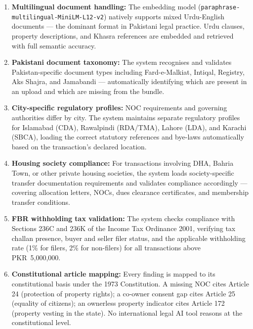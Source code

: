 \documentclass[12pt, a4paper]{article}
\begin{document}
\begin{enumerate}[leftmargin=1.5cm]
    \item \textbf{Multilingual document handling:} The embedding model
    (\texttt{paraphrase-
    multilingual-MiniLM-L12-v2}) natively supports mixed
    Urdu-English documents --- the dominant format in Pakistani legal practice.
    Urdu clauses, property descriptions, and Khasra references are embedded
    and retrieved with full semantic accuracy.

    \item \textbf{Pakistani document taxonomy:} The system recognises and
    validates Pakistan-specific document types including Fard-e-Malkiat,
    Intiqal, Registry, Aks Shajra, and Jamabandi --- automatically identifying
    which are present in an upload and which are missing from the bundle.

    \item \textbf{City-specific regulatory profiles:} NOC requirements and
    governing authorities differ by city. The system maintains separate
    regulatory profiles for Islamabad (CDA), Rawalpindi (RDA/TMA), Lahore
    (LDA), and Karachi (SBCA), loading the correct statutory references and
    bye-laws automatically based on the transaction's declared location.

    \item \textbf{Housing society compliance:} For transactions involving
    DHA, Bahria Town, or other private housing societies, the system loads
    society-specific transfer documentation requirements and validates
    compliance accordingly --- covering allocation letters, NOCs, dues
    clearance certificates, and membership transfer conditions.

    \item \textbf{FBR withholding tax validation:} The system checks
    compliance with Sections 236C and 236K of the Income Tax Ordinance 2001,
    verifying tax challan presence, buyer and seller filer status, and the
    applicable withholding rate (1\% for filers, 2\% for non-filers) for
    all transactions above PKR~5,000,000.

    \item \textbf{Constitutional article mapping:} Every finding is
    mapped to its constitutional basis under the 1973 Constitution.
    A missing NOC cites Article 24 (protection of property rights);
    a co-owner consent gap cites Article 25 (equality of citizens);
    an ownerless property indicator cites Article 172 (property
    vesting in the state). No international legal AI tool reasons
    at the constitutional level.


\end{enumerate}
\end{document}
